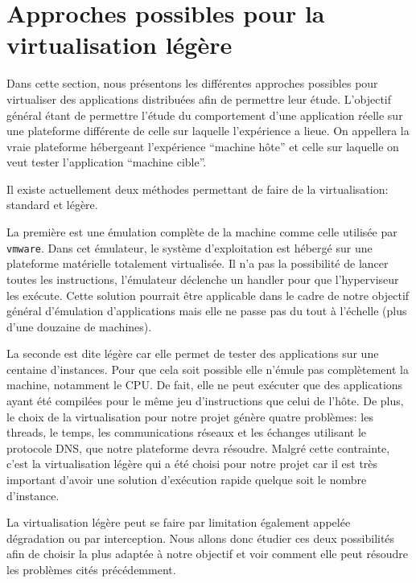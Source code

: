 \section{Approches possibles pour la virtualisation légère}
\label{section:emulation}

Dans cette section, nous présentons les différentes approches possibles pour
virtualiser des applications distribuées afin de permettre leur
étude. L'objectif général étant de permettre l'étude du comportement d'une
application réelle sur une plateforme différente de celle sur laquelle
l'expérience a lieue. On appellera la vraie plateforme hébergeant l'expérience
``machine hôte'' et celle sur laquelle on veut tester l'application ``machine cible''.

Il existe actuellement deux méthodes permettant de faire de la virtualisation:
standard et légère.

La première est une émulation complète de la machine comme celle utilisée par
\texttt{vmware}. Dans cet émulateur, le système d'exploitation est hébergé sur une
plateforme matérielle totalement virtualisée. Il n'a pas la possibilité de
lancer toutes les instructions, l'émulateur déclenche un handler pour que
l'hyperviseur les exécute. Cette solution pourrait être applicable dans le cadre de notre objectif général d'émulation d'applications mais elle ne passe pas du tout
à l'échelle (plus d'une douzaine de machines).

La seconde est dite légère car elle permet de tester des applications sur une
centaine d'instances. Pour que cela soit possible elle n'émule pas complètement
la machine, notamment le CPU. De fait, elle ne peut exécuter que des
applications ayant été compilées pour le même jeu d'instructions que celui de
l'hôte.  De plus, le choix de la virtualisation pour notre projet génère quatre
problèmes: les threads, le temps, les communications réseaux et les échanges
utilisant le protocole DNS, que notre plateforme devra résoudre. Malgré cette
contrainte, c'est la virtualisation légère qui a été choisi pour notre projet
car il est très important d'avoir une solution d'exécution rapide quelque soit
le nombre d'instance.

La virtualisation légère peut se faire par limitation également appelée
dégradation ou par interception. Nous allons donc étudier ces deux possibilités
afin de choisir la plus adaptée à notre objectif et voir comment
elle peut résoudre les problèmes cités précédemment.









